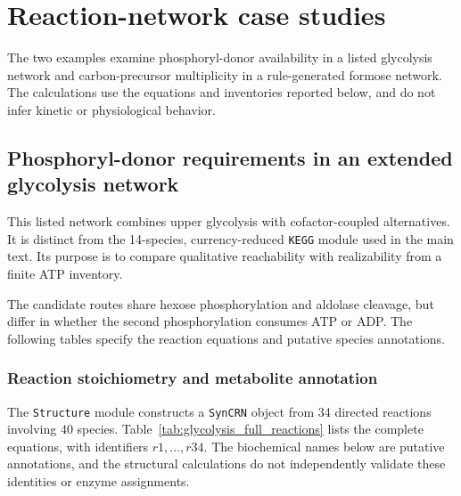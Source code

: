 \documentclass[pdflatex,referee]{../template/sn-jnl}
\theoremstyle{plain}%
\theoremstyle{definition}%
\theoremstyle{remark}%
\begin{document}
\section{Reaction-network case studies}
The two examples examine phosphoryl-donor availability in a listed glycolysis network and carbon-precursor multiplicity in a rule-generated formose network. The calculations use the equations and inventories reported below, and do not infer kinetic or physiological behavior.

\subsection{Phosphoryl-donor requirements in an extended glycolysis network}
\label{sec:si_case_glycolysis}

This listed network combines upper glycolysis with cofactor-coupled alternatives. It is distinct from the 14-species, currency-reduced \texttt{KEGG} module used in the main text. Its purpose is to compare qualitative reachability with realizability from a finite ATP inventory.

The candidate routes share hexose phosphorylation and aldolase cleavage, but differ in whether the second phosphorylation consumes ATP or ADP. The following tables specify the reaction equations and putative species annotations.

\subsubsection{Reaction stoichiometry and metabolite annotation}

The \texttt{Structure} module constructs a \texttt{SynCRN} object from 34 directed reactions involving 40 species. Table~\ref{tab:glycolysis_full_reactions} lists the complete equations, with identifiers $r1,\dots,r34$. The biochemical names below are putative annotations, and the structural calculations do not independently validate these identities or enzyme assignments.
\end{document}
